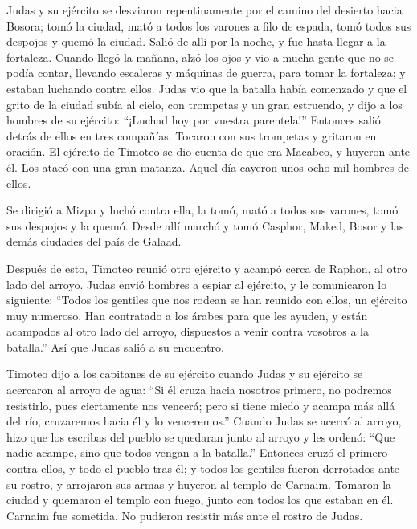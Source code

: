  Judas y su ejército se desviaron repentinamente por el
camino del desierto hacia Bosora; tomó la ciudad, mató a todos los
varones a filo de espada, tomó todos sus despojos y quemó la ciudad.
 Salió de allí por la noche, y fue hasta llegar a la
fortaleza.  Cuando llegó la mañana, alzó los ojos y vio a
mucha gente que no se podía contar, llevando escaleras y máquinas de
guerra, para tomar la fortaleza; y estaban luchando contra ellos.
 Judas vio que la batalla había comenzado y que el grito
de la ciudad subía al cielo, con trompetas y un gran estruendo,
 y dijo a los hombres de su ejército: ``¡Luchad hoy por
vuestra parentela!''  Entonces salió detrás de ellos en
tres compañías. Tocaron con sus trompetas y gritaron en oración.
 El ejército de Timoteo se dio cuenta de que era Macabeo,
y huyeron ante él. Los atacó con una gran matanza. Aquel día cayeron
unos ocho mil hombres de ellos.

 Se dirigió a Mizpa y luchó contra ella, la tomó, mató a
todos sus varones, tomó sus despojos y la quemó.  Desde
allí marchó y tomó Casphor, Maked, Bosor y las demás ciudades del país
de Galaad.

 Después de esto, Timoteo reunió otro ejército y acampó
cerca de Raphon, al otro lado del arroyo.  Judas envió
hombres a espiar al ejército, y le comunicaron lo siguiente: ``Todos los
gentiles que nos rodean se han reunido con ellos, un ejército muy
numeroso.  Han contratado a los árabes para que les
ayuden, y están acampados al otro lado del arroyo, dispuestos a venir
contra vosotros a la batalla.'' Así que Judas salió a su encuentro.

 Timoteo dijo a los capitanes de su ejército cuando Judas
y su ejército se acercaron al arroyo de agua: ``Si él cruza hacia
nosotros primero, no podremos resistirlo, pues ciertamente nos vencerá;
 pero si tiene miedo y acampa más allá del río,
cruzaremos hacia él y lo venceremos.''  Cuando Judas se
acercó al arroyo, hizo que los escribas del pueblo se quedaran junto al
arroyo y les ordenó: ``Que nadie acampe, sino que todos vengan a la
batalla.''  Entonces cruzó el primero contra ellos, y
todo el pueblo tras él; y todos los gentiles fueron derrotados ante su
rostro, y arrojaron sus armas y huyeron al templo de Carnaim.
 Tomaron la ciudad y quemaron el templo con fuego, junto
con todos los que estaban en él. Carnaim fue sometida. No pudieron
resistir más ante el rostro de Judas.

